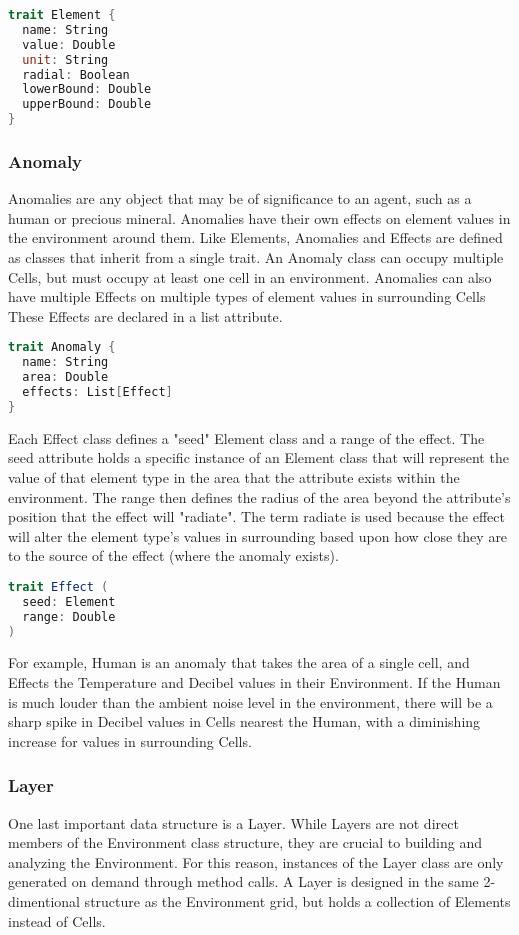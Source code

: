 \begin{lstlisting}[language=Scala]
trait Element {
  name: String
  value: Double
  unit: String
  radial: Boolean
  lowerBound: Double
  upperBound: Double
}
\end{lstlisting}



\subsubsection{Anomaly}
Anomalies are any object that may be of significance to an agent, such as a human or precious mineral.
Anomalies have their own effects on element values in the environment around them.
Like Elements, Anomalies and Effects are defined as classes that inherit from a single trait.
An Anomaly class can occupy multiple Cells, but must occupy at least one cell in an environment.
Anomalies can also have multiple Effects on multiple types of element values in surrounding Cells
These Effects are declared in a list attribute.

\begin{lstlisting}[language=Scala]
trait Anomaly {
  name: String
  area: Double
  effects: List[Effect]
}
\end{lstlisting}

Each Effect class defines a "seed" Element class and a range of the effect.
The seed attribute holds a specific instance of an Element class that will represent the value of that element type in the area that the attribute exists within the environment.
The range then defines the radius of the area beyond the attribute's position that the effect will "radiate".
The term radiate is used because the effect will alter the element type's values in surrounding based upon how close they are to the source of the effect (where the anomaly exists).

\begin{lstlisting}[language=Scala]
trait Effect (
  seed: Element
  range: Double
)
\end{lstlisting}

For example, Human is an anomaly that takes the area of a single cell, and Effects the Temperature and Decibel values in their Environment.
If the Human is much louder than the ambient noise level in the environment, there will be a sharp spike in Decibel values in Cells nearest the Human, with a diminishing increase for values in surrounding Cells.


\subsubsection{Layer}
One last important data structure is a Layer.
While Layers are not direct members of the Environment class structure, they are crucial to building and analyzing the Environment.
For this reason, instances of the Layer class are only generated on demand through method calls.
A Layer is designed in the same 2-dimentional structure as the Environment grid, but holds a collection of Elements instead of Cells.

